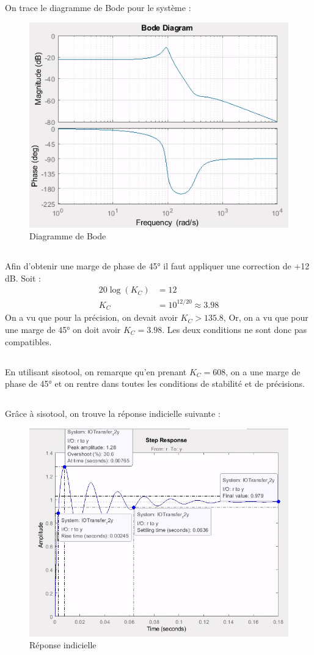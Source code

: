 \documentclass{article}
\begin{document}
\subsection{}
On trace le diagramme de Bode pour le système :
\begin{figure}[h]
    \centering
    \includegraphics[width=0.5\linewidth]{bode217.png}
    \caption{Diagramme de Bode}
    \label{fig:bode217}
\end{figure}
\subsection{}
Afin d'obtenir une marge de phase de 45° il faut appliquer une correction de +12 dB. Soit :
\begin{align*}
    20\log(K_C)&=12\\
    K_C&=10^{12/20}\approx3.98
\end{align*}
On a vu que pour la précision, on devait avoir $K_C>135.8$, Or, on a vu que pour une marge de 45° on doit avoir $K_C=3.98$. Les deux conditions ne sont donc pas compatibles.
\subsection{}
En utilisant sisotool, on remarque qu'en prenant $K_C=608$, on a une marge de phase de 45° et on rentre dans toutes les conditions de stabilité et de précisions.
\subsection{}
Grâce à sisotool, on trouve la réponse indicielle suivante :
\begin{figure}[h]
    \centering
    \includegraphics[width=0.75\linewidth]{sisotool2111.png}
    \caption{Réponse indicielle}
\end{figure}
\end{document}
